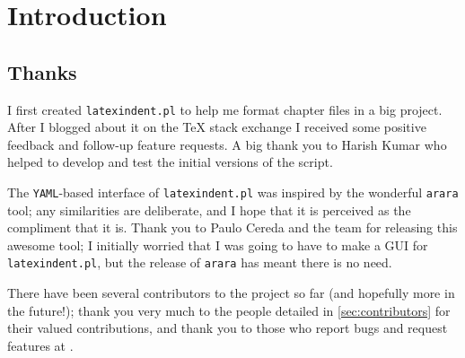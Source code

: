 \section{Introduction}
\subsection{Thanks}
	I first created \texttt{latexindent.pl} to help me format chapter files in a big project.
	After I blogged about it on the \TeX{} stack exchange \cite{cmhblog} I received some
	positive feedback and follow-up feature requests. A big thank you to Harish Kumar
	\cite{harish} who helped to develop and test the initial versions of the script.

	The \texttt{YAML}-based interface of \texttt{latexindent.pl} was inspired by the
	wonderful \texttt{arara} tool; any similarities are deliberate, and I hope that it is
	perceived as the compliment that it is. Thank you to Paulo Cereda and the team for
	releasing this awesome tool; I initially worried that I was going to have to make a GUI
	for \texttt{latexindent.pl}, but the release of \texttt{arara} has meant there is no
	need.

	There have been several contributors to the project so far (and hopefully more in the
	future!); thank you very much to the people detailed in \vref{sec:contributors} for their
	valued contributions, and thank you to those who report bugs and request features at
	\cite{latexindent-home}.

